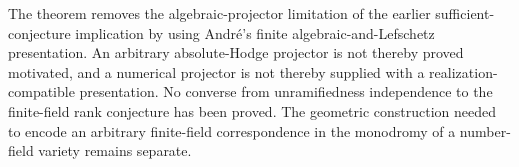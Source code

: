 \begin{remark}
\label{c:motivated-rank-reduction-scope}
The theorem removes the algebraic-projector limitation of the
earlier sufficient-conjecture implication by using Andr\'e's
finite algebraic-and-Lefschetz presentation. An arbitrary
absolute-Hodge projector is not thereby proved motivated,
and a numerical projector is not thereby supplied with a
realization-compatible presentation. No converse from
unramifiedness independence to the finite-field rank conjecture
has been proved. The geometric construction needed to encode
an arbitrary finite-field correspondence in the monodromy of
a number-field variety remains separate.
\end{remark}
